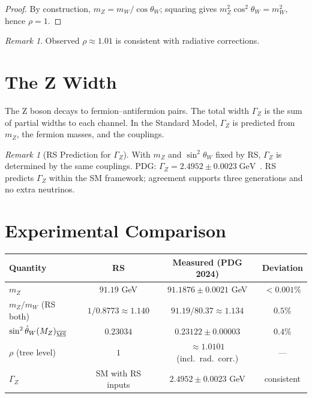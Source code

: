 \documentclass[12pt,a4paper]{article}
\theoremstyle{definition}
\theoremstyle{remark}
\newtheorem{remark}[theorem]{Remark}
\begin{document}
\begin{proof}
By construction, $m_Z = m_W/\cos\theta_W$; squaring gives
$m_Z^2\cos^2\theta_W = m_W^2$, hence $\rho = 1$.
\end{proof}

\begin{remark}
Observed $\rho \approx 1.01$ is consistent with radiative corrections.
\end{remark}

\section{The Z Width}
\label{sec:width}

The Z boson decays to fermion--antifermion pairs.  The total width
$\Gamma_Z$ is the sum of partial widths to each channel.  In the
Standard Model, $\Gamma_Z$ is predicted from $m_Z$, the fermion
masses, and the couplings.

\begin{remark}[RS Prediction for $\Gamma_Z$]
With $m_Z$ and $\sin^2\theta_W$ fixed by RS, $\Gamma_Z$ is determined
by the same couplings.  PDG: $\Gamma_Z = 2.4952 \pm 0.0023\;\mathrm{GeV}$~\cite{PDG2024}.
RS predicts $\Gamma_Z$ within the SM framework; agreement supports
three generations and no extra neutrinos.
\end{remark}

\section{Experimental Comparison}
\label{sec:comparison}

\begin{center}
\renewcommand{\arraystretch}{1.3}
\begin{tabular}{lccc}
\toprule
\textbf{Quantity} & \textbf{RS} & \textbf{Measured (PDG 2024)} & \textbf{Deviation}\\
\midrule
$m_Z$ & $91.19$ GeV & $91.1876 \pm 0.0021$ GeV & $<0.001\%$ \\
$m_Z/m_W$ (RS both) & $1/0.8773 \approx 1.140$ & $91.19/80.37 \approx 1.134$ & $0.5\%$ \\
$\sin^2\hat\theta_W(M_Z)_{\overline{\rm MS}}$
  & $0.23034$ & $0.23122 \pm 0.00003$ & $0.4\%$ \\
$\rho$ (tree level) & $1$ & $\approx 1.0101$ (incl.\ rad.\ corr.) & ---\\
$\Gamma_Z$ & SM with RS inputs & $2.4952 \pm 0.0023$ GeV & consistent \\
\bottomrule
\end{tabular}
\end{center}
\end{document}
